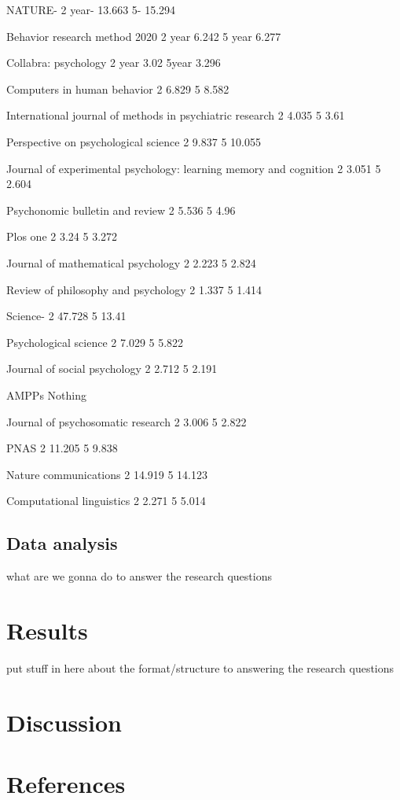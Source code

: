 \documentclass[
  english,
  man]{apa6}
\newlength{\cslhangindent}
\newlength{\cslentryspacingunit} %
\newenvironment{CSLReferences}[2] %
 {%
  \setlength{\parindent}{0pt}
  \ifodd #1
  \let\oldpar\par
  \def\par{\hangindent=\cslhangindent\oldpar}
  \fi
  \setlength{\parskip}{#2\cslentryspacingunit}
 }%
 {}
\begin{document}
NATURE- 
2 year- 13.663
5- 15.294

Behavior research method 2020
2 year 6.242
5 year 6.277

Collabra: psychology 
2 year 3.02
5year 3.296

Computers in human behavior
2 6.829
5 8.582

International journal of methods in psychiatric research
2 4.035
5 3.61 

Perspective on psychological science 
2 9.837
5 10.055 

Journal of experimental psychology: learning memory and cognition 
2 3.051
5 2.604 

Psychonomic  bulletin and review 
2 5.536
5 4.96

Plos one 
2 3.24
5 3.272

Journal of mathematical psychology 
2 2.223 
5 2.824

Review of philosophy and psychology 
2 1.337 
5 1.414

Science- 
2 47.728
5 13.41 

Psychological science 
2 7.029 
5 5.822

Journal of social psychology 
2 2.712
5 2.191

AMPPs 
Nothing 

Journal of psychosomatic research 
2 3.006
5 2.822

PNAS 
2 11.205
5 9.838

Nature communications
2 14.919
5 14.123 

Computational linguistics 
2 2.271
5 5.014 

\hypertarget{data-analysis}{%
\subsection{Data analysis}\label{data-analysis}}

what are we gonna do to answer the research questions

\hypertarget{results}{%
\section{Results}\label{results}}

put stuff in here about the format/structure to answering the research questions

\hypertarget{discussion}{%
\section{Discussion}\label{discussion}}

\newpage

\hypertarget{references}{%
\section{References}\label{references}}

\begingroup
\setlength{\parindent}{-0.5in}
\setlength{\leftskip}{0.5in}

\hypertarget{refs}{}
\begin{CSLReferences}{0}{0}
\end{CSLReferences}

\endgroup
\end{document}
